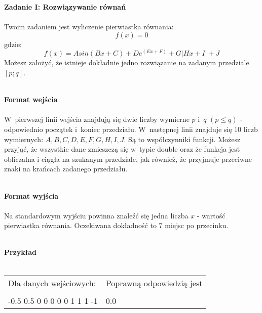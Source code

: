 \documentclass[
  fontsize=12pt  %
 ,english        %
 ,headinclude    %
 ,headsepline    %
]{scrbook}       %
\begin{document}
\vspace{50 mm}
\hspace{50 mm}
\newline

\par{\Large \textbf{Zadanie I: Rozwiązywanie równań}} \\ \\
\indent Twoim zadaniem jest wyliczenie pierwiastka równania:
 $$f(x) = 0$$
gdzie:
$$f(x) = Asin(Bx + C) + De^{(Ex + F)} + G|Hx + I| + J$$
Możesz założyć, że istnieje dokładnie jedno rozwiązanie na zadanym przedziale $[p; q]$.
\\ \\
\par{\Large \textbf{Format wejścia}} \\ \\
\indent W~pierwszej linii wejścia znajdują się dwie liczby wymierne $p$ i~$q$ $(p \leq q)$ - odpowiednio początek i~koniec przedziału. W~następnej linii znajduje się $10$ liczb wymiernych: $A, B, C, D, E, F, G, H, I, J$. Są to współczynniki funkcji. Możesz przyjąć, że wszystkie dane zmieszczą się w~typie double oraz że funkcja jest obliczalna i ciągła na szukanym przedziale, jak również, że przyjmuje przeciwne znaki na krańcach zadanego przedziału.
\\ \\
\par{\Large \textbf{Format wyjścia}} \\ \\
\indent Na standardowym wyjściu powinna znaleźć się jedna liczba $x$ - wartość pierwiastka równania.
Oczekiwana dokładność to $7$ miejsc po przecinku.
\\ \\
\par{\Large \textbf{Przykład}} \\ \\
\begin{tabular}{ p{7cm} p{7cm} }
	Dla danych wejściowych: \hspace{40mm}& Poprawną odpowiedzią jest \\
& \\

-0.5 0.5 \newline
0 0 0 0 0 0 1 1 1 -1 \newline

&   
0.0 \newline

\\

\end{tabular}
\end{document}
